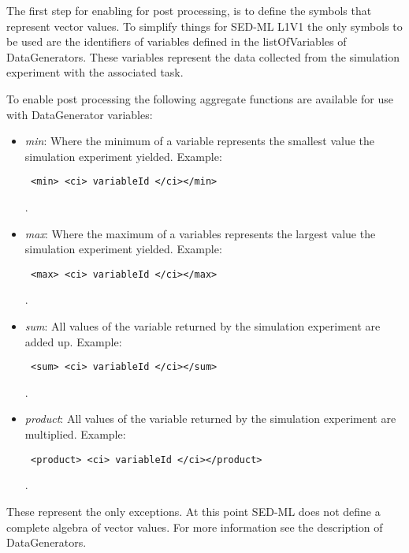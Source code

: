 The first step for enabling for post processing, is to define the symbols that 
represent vector values. To simplify things for SED-ML L1V1 the only symbols to 
be used are the identifiers of variables defined in the listOfVariables of 
DataGenerators. These variables represent the data collected from the 
simulation experiment with the associated task. 

To enable post processing the following aggregate functions are available for 
use with DataGenerator variables: 

\begin{itemize}\setlength{\parskip}{-0.1ex}

\item \emph{min}: Where the minimum of a variable represents the smallest value 
the simulation experiment yielded. Example: 

\begin{verbatim} <min> <ci> variableId </ci></min> \end{verbatim}.

\item \emph{max}: Where the maximum of a variables represents the largest value 
the simulation experiment yielded. Example: 

\begin{verbatim} <max> <ci> variableId </ci></max> \end{verbatim}.

\item \emph{sum}: All values of the variable returned by the simulation 
experiment are added up. Example: 

\begin{verbatim} <sum> <ci> variableId </ci></sum> \end{verbatim}.

\item \emph{product}: All values of the variable returned by the simulation 
experiment are multiplied. Example: 

\begin{verbatim} <product> <ci> variableId </ci></product> \end{verbatim}.

\end{itemize}

These represent the only exceptions. At this point SED-ML does not define a 
complete algebra of vector values. For more information see the description of 
DataGenerators.


